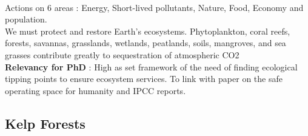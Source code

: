\documentclass[]{report}
\begin{document}
\begin{itemize}
		\\ Actions on 6 areas : Energy, Short-lived pollutants, Nature, Food, Economy and population.
		\\We must protect and restore Earth’s
		ecosystems. Phytoplankton, coral reefs,
		forests, savannas, grasslands, wetlands,
		peatlands, soils, mangroves, and sea
		grasses contribute greatly to sequestration
		of atmospheric CO2
		\\\textbf{Relevancy for PhD} : High as set framework of the need of finding ecological tipping points to ensure ecosystem services. To link with paper on the safe operating space for humanity and IPCC reports. 


		\subsection{Kelp Forests}
			

\end{itemize}
\end{document}
